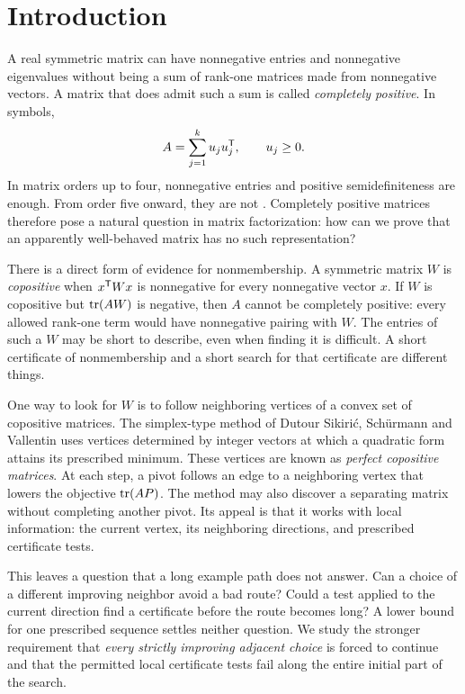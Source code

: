 \section{Introduction}\label{sec:intro}
A real symmetric matrix can have nonnegative entries and nonnegative eigenvalues without being a sum of rank-one matrices made from nonnegative vectors. A matrix that does admit such a sum is called \emph{completely positive}. In symbols,
\[
 A=\sum_{j=1}^k u_ju_j^{\mathsf T},\qquad u_j\ge0.
\]
In matrix orders up to four, nonnegative entries and positive semidefiniteness are enough. From order five onward, they are not \cite{Diananda,MM}. Completely positive matrices therefore pose a natural question in matrix factorization: how can we prove that an apparently well-behaved matrix has no such representation?

There is a direct form of evidence for nonmembership. A symmetric matrix $W$ is \emph{copositive} when $x^{\mathsf T} Wx$ is nonnegative for every nonnegative vector $x$. If $W$ is copositive but $\operatorname{tr}(AW)$ is negative, then $A$ cannot be completely positive: every allowed rank-one term would have nonnegative pairing with $W$. The entries of such a $W$ may be short to describe, even when finding it is difficult. A short certificate of nonmembership and a short search for that certificate are different things.

One way to look for $W$ is to follow neighboring vertices of a convex set of copositive matrices. The simplex-type method of Dutour Sikiri\'c, Sch\"urmann and Vallentin \cite{DSV} uses vertices determined by integer vectors at which a quadratic form attains its prescribed minimum. These vertices are known as \emph{perfect copositive matrices}. At each step, a pivot follows an edge to a neighboring vertex that lowers the objective $\operatorname{tr}(AP)$. The method may also discover a separating matrix without completing another pivot. Its appeal is that it works with local information: the current vertex, its neighboring directions, and prescribed certificate tests.

This leaves a question that a long example path does not answer. Can a choice of a different improving neighbor avoid a bad route? Could a test applied to the current direction find a certificate before the route becomes long? A lower bound for one prescribed sequence settles neither question. We study the stronger requirement that \emph{every strictly improving adjacent choice} is forced to continue and that the permitted local certificate tests fail along the entire initial part of the search.


